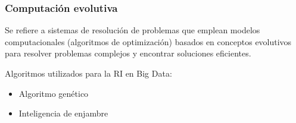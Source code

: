 \documentclass[
10pt, %
aspectratio=169, %
]{beamer}
\begin{document}
	\begin{frame}
		
		\frametitle{Computación evolutiva}
		
		\begin{alertblock}{}
			Se refiere a sistemas de resolución de problemas que emplean modelos computacionales (algoritmos de optimización) basados en conceptos evolutivos para resolver problemas complejos y encontrar soluciones eficientes.
		\end{alertblock}
		
		
		\vspace{1.5\baselineskip}
		
		Algoritmos utilizados para la RI en Big Data:
		\begin{itemize}
			\item Algoritmo genético
					
			\item Inteligencia de enjambre
			

\end{itemize}
\end{frame}
\end{document}

